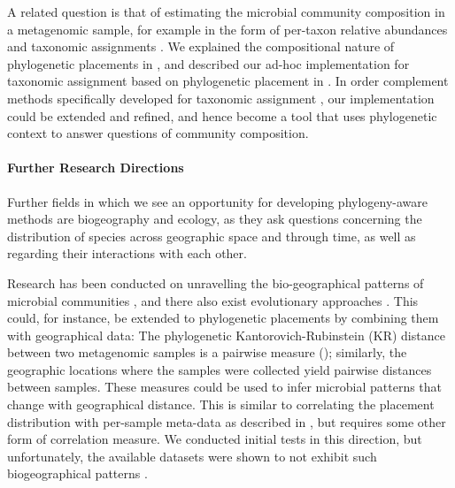 
A related question is that of estimating the microbial community composition in a metagenomic sample,
for example in the form of per-taxon relative abundances and taxonomic assignments \cite{Lindgreen2016}.
We explained the compositional nature of phylogenetic placements in
,
and described our ad-hoc implementation for taxonomic assignment based on phylogenetic placement in %
.
In order complement methods specifically developed for taxonomic assignment
\cite{Lindgreen2016,Sczyrba2017,Almeida2018},
our implementation could be extended and refined,
and hence become a tool that uses phylogenetic context to answer questions of community composition.


\paragraph{Further Research Directions}
\label{ch:ConclusionOutlook:sec:ResearchQuestions:par:FurtherResearch}

Further fields in which we see an opportunity for developing phylogeny-aware methods are biogeography and ecology,
as they ask questions concerning the distribution of species across geographic space and through time,
as well as regarding their interactions with each other.

Research has been conducted on unravelling the bio-geographical patterns of microbial communities
\cite{HughesMartiny2006}, and there also exist evolutionary approaches \cite{Cox2016}.
This could, for instance, be extended to phylogenetic placements by combining them with geographical data:
The phylogenetic Kantorovich-Rubinstein (KR) distance between two metagenomic samples is a pairwise measure
();
similarly, the geographic locations where the samples were collected yield pairwise distances between samples.
These measures could be used to infer microbial patterns that change with geographical distance.
This is similar to correlating the placement distribution with per-sample meta-data
as described in ,
but requires some other form of correlation measure.
We conducted initial tests in this direction, but unfortunately,
the available datasets were shown to not exhibit such biogeographical patterns \cite{Lentendu2018}.


